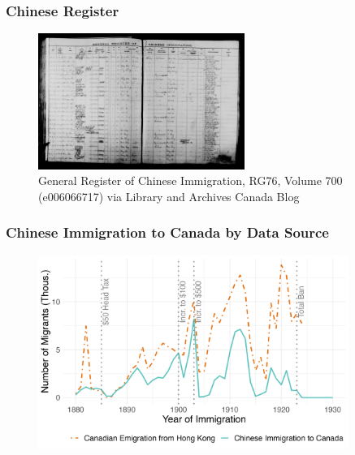 \documentclass[xcolor=dvipsnames, compress, 12pt, aspectratio=169, handout]{beamer}
\begin{document}
\begin{frame}
    \label{fig_register}
    \frametitle{Chinese Register  \hyperlink{data}{}}
    \centering
    \begin{figure}
        \includegraphics[width = 0.6\textwidth]{../../figs/slides/register.jpeg}
        \caption{\footnotesize General Register of Chinese Immigration, RG76, Volume 700 (e006066717) via Library and Archives Canada Blog}
    \end{figure}
\end{frame}

\begin{frame}
    \label{figa2_imm}
    \frametitle{Chinese Immigration to Canada by Data Source \hyperlink{data}{}}
    \centering
    \begin{figure}
        \includegraphics[width = 0.9\textwidth]{../../figs/slides/fig2_flow_immandem.png}
    \end{figure}
\end{frame}
\end{document}
